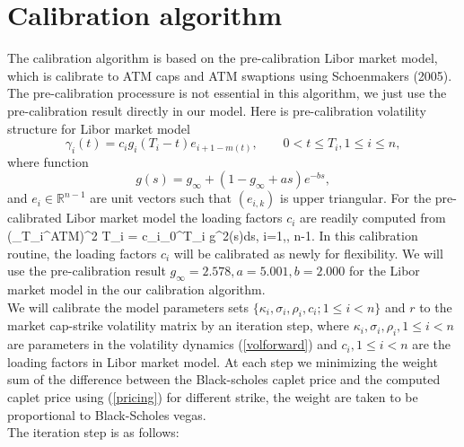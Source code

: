\documentclass[12pt]{article}
\theoremstyle{definition}
\numberwithin{equation}{section} \theoremstyle{remark}
\begin{document}
\section{Calibration algorithm}
The calibration algorithm is based on the pre-calibration Libor market model, which is calibrate to ATM caps and ATM swaptions using Schoenmakers (2005). The pre-calibration processure is not essential in this algorithm, we just use the pre-calibration result directly in our model. Here is pre-calibration volatility structure for Libor market model
$$\gamma_i(t)=c_ig_i(T_i -t) e_{i+1-m(t)},\quad \quad 0< t\leq T_i, 1\leq i\leq n,$$ where
function $$g(s)= g_{\infty} + (1-g_{\infty} +as) e^{-bs},$$ and $e_i\in \mathbb{R}^{n-1}$ are unit vectors such that $(e_{i,k})$ is upper triangular.
For the pre-calibrated Libor market model the loading factors $c_i$ are readily computed from
\beq\label{lf}
\left(\sigma_{T_i}^{ATM}\right)^2 T_i = c_i\int_0^{T_i} g^2(s)ds, \quad \quad i=1,\cdots, n-1.
\nneq
In this calibration routine, the loading factors $c_i$ will be calibrated as newly for flexibility.
We will use the pre-calibration result $g_{\infty}=2.578, a= 5.001, b=2.000$ for the Libor market model in the our calibration algorithm.\\


We will calibrate the model parameters sets $\{\kappa_i, \sigma_i, \rho_i, c_i; 1\leq i <n \}$ and $r$ to the market cap-strike volatility matrix by an iteration step, where $\kappa_i, \sigma_i, \rho_i, 1\leq i <n$ are parameters in the volatility dynamics (\ref{volforward}) and $c_i, 1\leq i <n$ are the loading factors in Libor market model. At each step we minimizing the weight sum of the difference between the Black-scholes caplet price and the computed caplet price using (\ref{pricing}) for different strike, the weight are taken to be proportional to Black-Scholes vegas.\\

The iteration step is as follows:\\
\end{document}
